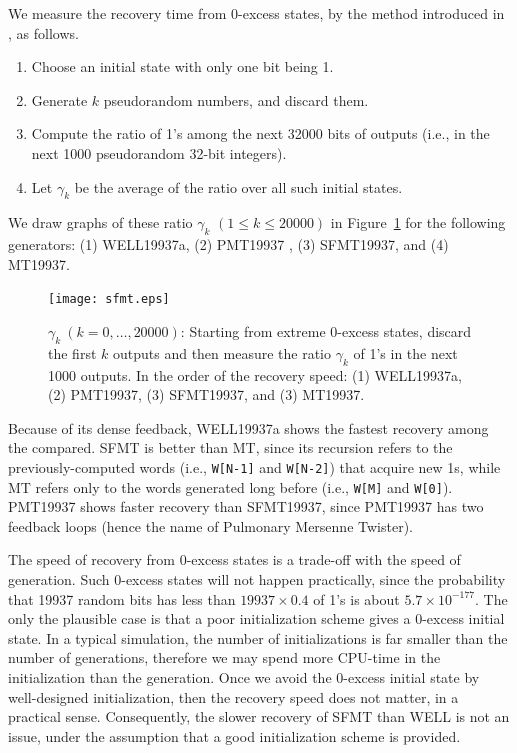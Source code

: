 \documentclass[acmnow]{acmtrans2m}
\begin{document}
We measure the recovery time from 0-excess states, 
by the method introduced in \cite{WELL}, as follows.
\begin{enumerate}
\item Choose an initial state with only one bit being 1.
\item Generate $k$ pseudorandom numbers, and discard them.
\item Compute the ratio of 1's among the 
next 32000 bits of outputs
(i.e., in the next 1000 pseudorandom 32-bit integers).
\item Let $\gamma_k$ be the average of the ratio over
all such initial states.
\end{enumerate}
We draw graphs of these ratio $\gamma_k$ $(1 \leq k \leq 20000)$
in Figure~\ref{fig:zero-recovery}
for the following generators: (1) WELL19937a, 
(2) PMT19937 \cite{PMT}, (3) SFMT19937, and (4) MT19937. 
\begin{figure}
\texttt{[image: sfmt.eps]}
\caption{$\gamma_k \ (k=0,\ldots,20000)$:
Starting from extreme 0-excess states,
discard the first $k$ outputs and then measure
the ratio $\gamma_k$ of 1's in the next 1000 outputs. 
In the order of the recovery speed: 
(1) WELL19937a, 
(2) PMT19937, (3) SFMT19937, and (3) MT19937.
}\label{fig:zero-recovery}
\end{figure}
Because of its dense feedback, WELL19937a shows
the fastest recovery among the compared. 
SFMT is better than MT, since its recursion refers to 
the previously-computed words (i.e., {\tt W[N-1]} and {\tt W[N-2]}) 
that acquire new 1s, while
MT refers only to the words generated long before 
(i.e., {\tt W[M]} and {\tt W[0]}). PMT19937 shows faster recovery 
than SFMT19937, since PMT19937 has two feedback loops
(hence the name of Pulmonary Mersenne Twister).

The speed of recovery from 0-excess states 
is a trade-off 
with the speed of generation. 
Such 0-excess states will not happen practically, 
since the probability 
that 19937 random bits has less than $19937\times 0.4$ of 1's 
is about $5.7\times 10^{-177}$.
The only the plausible case is that
a poor initialization scheme gives a 0-excess initial state. 
In a typical simulation, the number of 
initializations is far smaller than the number of generations,
therefore we may spend more CPU-time in the initialization
than the generation. Once we avoid the 0-excess initial state
by well-designed initialization, then the recovery 
speed does not matter, in a practical sense. 
Consequently, the slower recovery of SFMT than WELL 
is not an issue, under the assumption that
a good initialization scheme is provided. 
\end{document}
